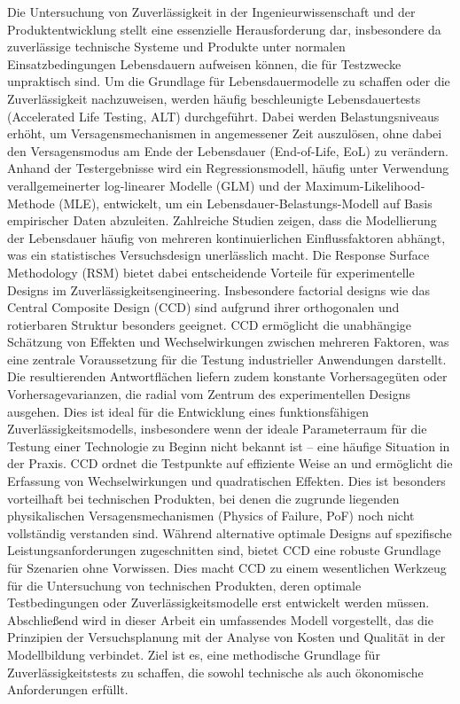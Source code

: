 Die Untersuchung von Zuverlässigkeit in der Ingenieurwissenschaft und der Produktentwicklung stellt eine essenzielle Herausforderung dar, insbesondere da zuverlässige technische Systeme und Produkte unter normalen Einsatzbedingungen Lebensdauern aufweisen können, die für Testzwecke unpraktisch sind. Um die Grundlage für Lebensdauermodelle zu schaffen oder die Zuverlässigkeit nachzuweisen, werden häufig beschleunigte Lebensdauertests (Accelerated Life Testing, ALT) durchgeführt.
Dabei werden Belastungsniveaus erhöht, um Versagensmechanismen in angemessener Zeit auszulösen, ohne dabei den Versagensmodus am Ende der Lebensdauer (End-of-Life, EoL) zu verändern. Anhand der Testergebnisse wird ein Regressionsmodell, häufig unter Verwendung verallgemeinerter log-linearer Modelle (GLM) und der Maximum-Likelihood-Methode (MLE), entwickelt, um ein Lebensdauer-Belastungs-Modell auf Basis empirischer Daten abzuleiten.
Zahlreiche Studien zeigen, dass die Modellierung der Lebensdauer häufig von mehreren kontinuierlichen Einflussfaktoren abhängt, was ein statistisches Versuchsdesign unerlässlich macht.
Die Response Surface Methodology (RSM) bietet dabei entscheidende Vorteile für experimentelle Designs im Zuverlässigkeitsengineering. Insbesondere factorial designs wie das Central Composite Design (CCD) sind aufgrund ihrer orthogonalen und rotierbaren Struktur besonders geeignet.
CCD ermöglicht die unabhängige Schätzung von Effekten und Wechselwirkungen zwischen mehreren Faktoren, was eine zentrale Voraussetzung für die Testung industrieller Anwendungen darstellt.
Die resultierenden Antwortflächen liefern zudem konstante Vorhersagegüten oder Vorhersagevarianzen, die radial vom Zentrum des experimentellen Designs ausgehen.
Dies ist ideal für die Entwicklung eines funktionsfähigen Zuverlässigkeitsmodells, insbesondere wenn der ideale Parameterraum für die Testung einer Technologie zu Beginn nicht bekannt ist – eine häufige Situation in der Praxis. CCD ordnet die Testpunkte auf effiziente Weise an und ermöglicht die Erfassung von Wechselwirkungen und quadratischen Effekten.
Dies ist besonders vorteilhaft bei technischen Produkten, bei denen die zugrunde liegenden physikalischen Versagensmechanismen (Physics of Failure, PoF) noch nicht vollständig verstanden sind.
Während alternative optimale Designs auf spezifische Leistungsanforderungen zugeschnitten sind, bietet CCD eine robuste Grundlage für Szenarien ohne Vorwissen.
Dies macht CCD zu einem wesentlichen Werkzeug für die Untersuchung von technischen Produkten, deren optimale Testbedingungen oder Zuverlässigkeitsmodelle erst entwickelt werden müssen.
Abschließend wird in dieser Arbeit ein umfassendes Modell vorgestellt, das die Prinzipien der Versuchsplanung mit der Analyse von Kosten und Qualität in der Modellbildung verbindet. Ziel ist es, eine methodische Grundlage für Zuverlässigkeitstests zu schaffen, die sowohl technische als auch ökonomische Anforderungen erfüllt.

